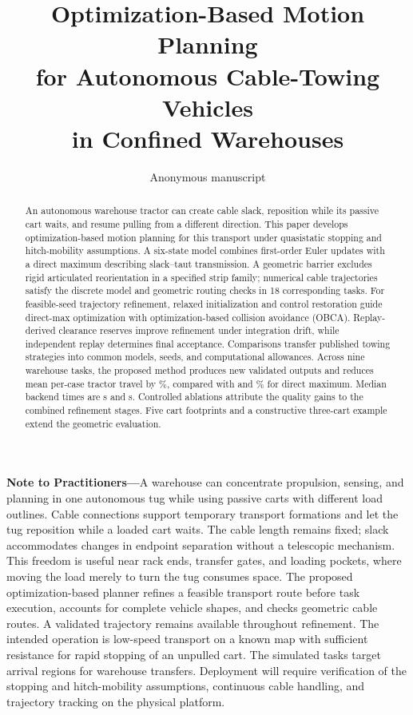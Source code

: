 \documentclass[10pt,journal,twoside]{IEEEtran}
\title{Optimization-Based Motion Planning\\for Autonomous Cable-Towing Vehicles\\in Confined Warehouses}
\author{Anonymous manuscript}
\begin{document}
\raggedbottom

\maketitle
\begin{abstract}
An autonomous warehouse tractor can create cable slack, reposition while its passive cart waits, and resume pulling from a different direction. This paper develops optimization-based motion planning for this transport under quasistatic stopping and hitch-mobility assumptions. A six-state model combines first-order Euler updates with a direct maximum describing slack--taut transmission. A geometric barrier excludes rigid articulated reorientation in a specified strip family; numerical cable trajectories satisfy the discrete model and geometric routing checks in 18 corresponding tasks. For feasible-seed trajectory refinement, relaxed initialization and control restoration guide direct-max optimization with optimization-based collision avoidance (OBCA). Replay-derived clearance reserves improve refinement under integration drift, while independent replay determines final acceptance. Comparisons transfer published towing strategies into common models, seeds, and computational allowances. Across nine warehouse tasks, the proposed method produces \ProposedNew{} new validated outputs and reduces mean per-case tractor travel by \ProposedGain\%, compared with \MaxNew{} and \MaxGain\% for direct maximum. Median backend times are \ProposedTime{} s and \MaxTime{} s. Controlled ablations attribute the quality gains to the combined refinement stages. Five cart footprints and a constructive three-cart example extend the geometric evaluation.
\end{abstract}

\vspace{.3em}
{\small
\noindent\textbf{Note to Practitioners---}A warehouse can concentrate propulsion, sensing, and planning in one autonomous tug while using passive carts with different load outlines. Cable connections support temporary transport formations and let the tug reposition while a loaded cart waits. The cable length remains fixed; slack accommodates changes in endpoint separation without a telescopic mechanism. This freedom is useful near rack ends, transfer gates, and loading pockets, where moving the load merely to turn the tug consumes space. The proposed optimization-based planner refines a feasible transport route before task execution, accounts for complete vehicle shapes, and checks geometric cable routes. A validated trajectory remains available throughout refinement. The intended operation is low-speed transport on a known map with sufficient resistance for rapid stopping of an unpulled cart. The simulated tasks target arrival regions for warehouse transfers. Deployment will require verification of the stopping and hitch-mobility assumptions, continuous cable handling, and trajectory tracking on the physical platform.
\par}
\end{document}
